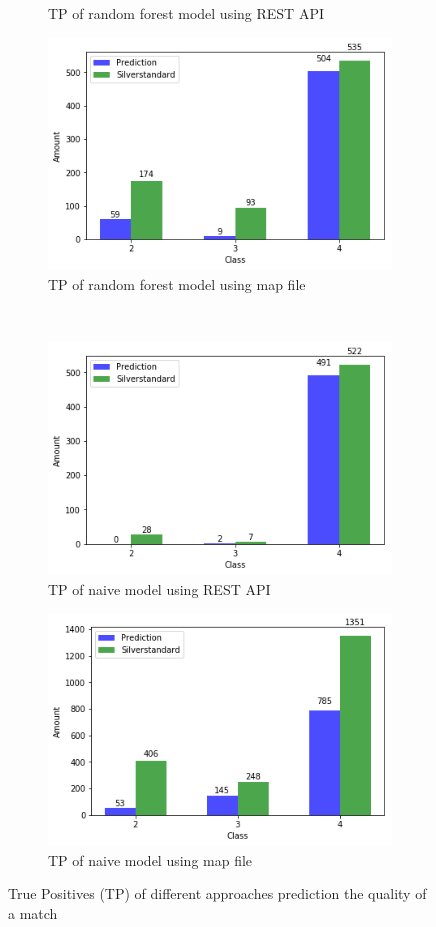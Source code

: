 \documentclass[runningheads]{llncs}
\begin{document}
\begin{figure}[H]
\begin{subfigure}{.5\textwidth}
            \caption{TP of random forest model using REST API}
        \end{subfigure}
        \begin{subfigure}{.4\textwidth}
            \includegraphics[scale=0.35]{rfFile.png}
            \caption{TP of random forest model using map file}
        \end{subfigure}
        \\
        \begin{subfigure}{.5\textwidth}
            \includegraphics[scale=0.35]{nREST.png}
            \caption{TP of naive model using REST API}
        \end{subfigure}
        \begin{subfigure}{.4\textwidth}
            \includegraphics[scale=0.35]{nFile.png}
            \caption{TP of naive model using map file}
        \end{subfigure}
        \caption{True Positives (TP) of different approaches prediction the quality of a match}
        \label{fig:tp}
    \end{figure}
    
\end{document}
